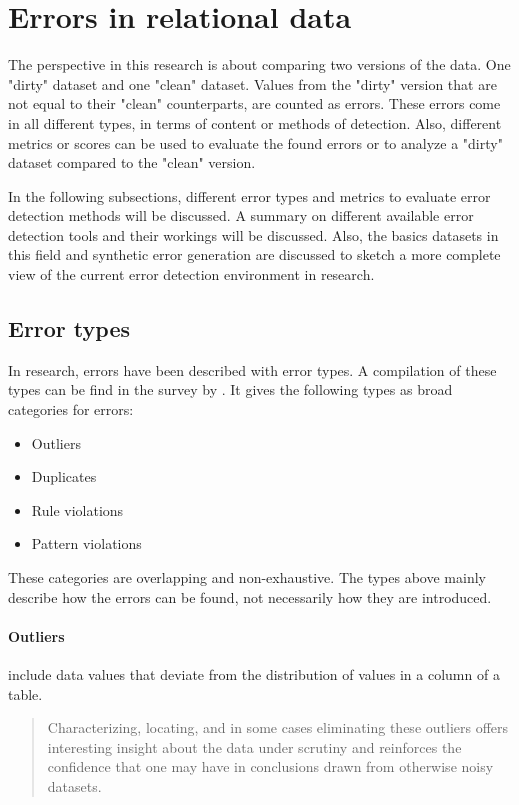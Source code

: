 \section{Errors in relational data}
The perspective in this research is about comparing two versions of the data. One "dirty" dataset and one "clean" dataset. Values from the "dirty" version that are not equal to their "clean" counterparts, are counted as errors. These errors come in all different types, in terms of content or methods of detection. Also, different metrics or scores can be used to evaluate the found errors or to analyze a "dirty" dataset compared to the "clean" version.
 
In the following subsections, different error types and metrics to evaluate error detection methods will be discussed. A summary on different available error detection tools and their workings will be discussed. Also, the basics datasets in this field and synthetic error generation are discussed to sketch a more complete view of the current error detection environment in research.

\subsection{Error types}
\label{subsec:errortypes}
In research, errors have been described with error types. A compilation of these types can be find in the survey by \cite{Abedjan2016-jc}. It gives the following types as broad categories for errors:
\begin{itemize}
    \item Outliers
    \item Duplicates
    \item Rule violations
    \item Pattern violations
\end{itemize}

These categories are overlapping and non-exhaustive. The types above mainly describe how the errors can be found, not necessarily how they are introduced. 

\paragraph{Outliers} include data values that deviate from the distribution of values in a column of a table.
\blockquote{Characterizing,
locating, and in some cases eliminating these outliers offers
interesting insight about the data under scrutiny and reinforces
the confidence that one may have in conclusions drawn from
otherwise noisy datasets. \cite{Pit--Claudel2016-dj}}. 

